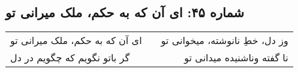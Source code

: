 \begin{center}
\section*{شماره ۴۵: ای آن که به حکم، ملک میرانی تو}
\label{sec:045}
\begin{longtable}{l p{0.5cm} r}
ای آن که به حکم، ملک میرانی تو
&&
وز دل، خطِ نانوشته، میخوانی تو
\\
گر باتو نگویم که چگویم در دل
&&
نا گفته وناشنیده میدانی تو
\\
\end{longtable}
\end{center}
